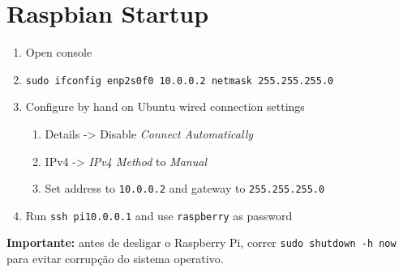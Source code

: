 \documentclass{article}
\begin{document}
\section{Raspbian Startup}
\begin{comment}
	Mas isto é para escrever em inglês??
\end{comment}
\begin{enumerate}
	\item Open console
	\item \texttt{sudo ifconfig enp2s0f0 10.0.0.2 netmask 255.255.255.0}
	\item Configure by hand on Ubuntu wired connection settings
	\begin{enumerate}
		\item Details -> Disable \textit{Connect Automatically}
		\item IPv4 -> \textit{IPv4 Method} to \textit{Manual}
		\item Set address to \texttt{10.0.0.2} and gateway to \texttt{255.255.255.0}
	\end{enumerate}
	\item Run \texttt{ssh pi\@10.0.0.1} and use \texttt{raspberry} as password
\end{enumerate}

\textbf{Importante:} antes de desligar o Raspberry Pi, correr \texttt{sudo shutdown -h now} para evitar corrupção do sistema operativo.

\pagebreak
\printbibliography
\end{document}

